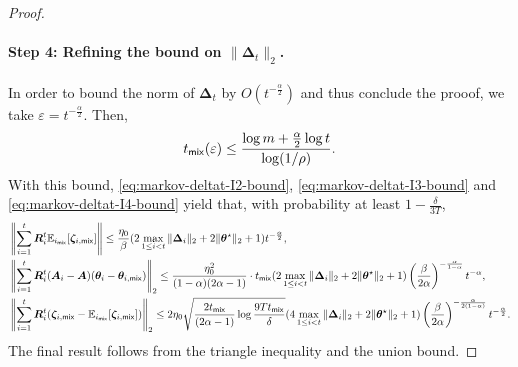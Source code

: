 \begin{proof}
\paragraph{Step 4: Refining the bound on $\|\bm{\Delta}_t\|_2$.} In order to bound the norm of $\bm{\Delta}_t$ by $O(t^{-\frac{\alpha}{2}})$ and thus conclude the prooof, we take $\varepsilon = t^{-\frac{\alpha}{2}}$. Then,
\begin{align*}
t_{\mathsf{mix}}(\varepsilon) \leq \frac{\log m + \frac{\alpha}{2}\log t}{\log(1/\rho)}.
\end{align*}
With this bound, \eqref{eq:markov-deltat-I2-bound}, \eqref{eq:markov-deltat-I3-bound} and \eqref{eq:markov-deltat-I4-bound} yield that, with probability at least $1-\frac{\delta}{3T}$,
\begin{align*}
&\left\| \sum_{i=1}^t \bm{R}_i^t \mathbb{E}_{i_{\mathsf{mix}}}[\bm{\zeta}_{i,\mathsf{mix}}] \right\|\leq \frac{\eta_0}{\beta}(2\max_{1 \leq i < t} \|\bm{\Delta}_i\|_2 + 2\|\bm{\theta}^\star\|_2  + 1)t^{-\frac{\alpha}{2}}, \\ 
&\left\|\sum_{i=1}^t \bm{R}_i^t (\bm{A}_i - \bm{A}) (\bm{\theta}_i - \bm{\theta}_{i,\mathsf{mix}})\right\|_2 \leq \frac{\eta_0^2}{(1-\alpha)(2\alpha-1)} \cdot t_{\mathsf{mix}}(2\max_{1 \leq i < t} \|\bm{\Delta}_i\|_2 + 2\|\bm{\theta}^\star\|_2  + 1) \left(\frac{\beta}{2\alpha}\right)^{-\frac{\alpha}{1-\alpha}}t^{-\alpha}, \\ 
&\left\|\sum_{i=1}^t \bm{R}_i^t (\bm{\zeta}_{i,\mathsf{mix}} - \mathbb{E}_{i_{\mathsf{mix}}}[\bm{\zeta}_{i,\mathsf{mix}}])\right\|_2 \leq 2 \eta_0 \sqrt{\frac{2t_{\mathsf{mix}}}{(2\alpha-1)}\log \frac{9Tt_{\mathsf{mix}}}{\delta}}(4\max_{1 \leq i < t} \|\bm{\Delta}_i\|_2 + 2\|\bm{\theta}^\star\|_2  + 1)\left(\frac{\beta}{2\alpha}\right)^{-\frac{\alpha}{2(1-\alpha)}}t^{-\frac{\alpha}{2}}.
\end{align*}
The final result follows from the triangle inequality and the union bound. 
\end{proof}


